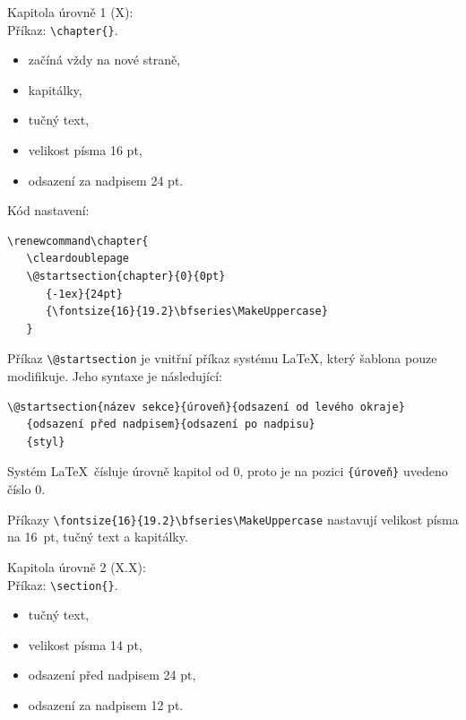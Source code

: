 Kapitola úrovně 1 (X):\\
Příkaz: \verb|\chapter{}|.

\begin{itemize}[label=-]
	\item začíná vždy na nové straně,
	\item kapitálky,
	\item tučný text,
	\item velikost písma 16 pt,
	\item odsazení za nadpisem 24 pt.
\end{itemize}

Kód nastavení:

\begin{verbatim}
\renewcommand\chapter{
   \cleardoublepage
   \@startsection{chapter}{0}{0pt}
      {-1ex}{24pt}
      {\fontsize{16}{19.2}\bfseries\MakeUppercase}
   } 
\end{verbatim}

Příkaz \verb|\@startsection| je vnitřní příkaz systému \LaTeX, který šablona pouze modifikuje. Jeho syntaxe je následující:

\begin{verbatim}
\@startsection{název sekce}{úroveň}{odsazení od levého okraje}
   {odsazení před nadpisem}{odsazení po nadpisu}
   {styl}
\end{verbatim}

Systém \LaTeX\ čísluje úrovně kapitol od 0, proto je na pozici \verb|{úroveň}| uvedeno číslo 0.

Příkazy \verb|\fontsize{16}{19.2}\bfseries\MakeUppercase| nastavují velikost písma na 16~pt, tučný text a kapitálky.

Kapitola úrovně 2 (X.X):\\
Příkaz: \verb|\section{}|.

\begin{itemize}[label=-]
	\item tučný text,
	\item velikost písma 14 pt,
	\item odsazení před nadpisem 24 pt,
	\item odsazení za nadpisem 12 pt.
\end{itemize}

